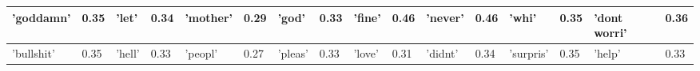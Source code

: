 \documentclass{icsthesis}
\begin{document}
\begin{mainmatter}
\begin{table}
{\begin{tabular}{|ll|ll|ll|ll|ll|ll|ll|ll|}
                    \multicolumn{1}{|l|}{'goddamn'} & 0.35        & \multicolumn{1}{l|}{'let'}  & 0.34       & \multicolumn{1}{l|}{'mother'} & 0.29        & \multicolumn{1}{l|}{'god'}    & 0.33        & \multicolumn{1}{l|}{'fine'}  & 0.46        & \multicolumn{1}{l|}{'never'} & 0.46        & \multicolumn{1}{l|}{'whi'}        & 0.35        & \multicolumn{1}{l|}{'dont worri'} & 0.36        \\ 
                    \hline
                    \multicolumn{1}{|l|}{'bullshit'} & 0.35        & \multicolumn{1}{l|}{'hell'} & 0.33       & \multicolumn{1}{l|}{'peopl'}   & 0.27        & \multicolumn{1}{l|}{'pleas'}  & 0.33        & \multicolumn{1}{l|}{'love'}  & 0.31       & \multicolumn{1}{l|}{'didnt'} & 0.34        & \multicolumn{1}{l|}{'surpris'}       & 0.35        & \multicolumn{1}{l|}{'help'}       & 0.33       \\ 
                    \hline
                    \end{tabular}%
                    }
                \end{table}
                

\end{mainmatter}
\end{document}
